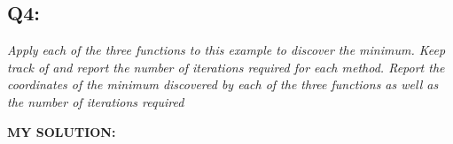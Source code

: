 \documentclass[
]{article}
\begin{document}
\hypertarget{q4}{%
\subsection{Q4:}\label{q4}}

\emph{Apply each of the three functions to this example to discover the
minimum. Keep track of and report the number of iterations required for
each method. Report the coordinates of the minimum discovered by each of
the three functions as well as the number of iterations required}

\textbf{MY SOLUTION:}
\end{document}
